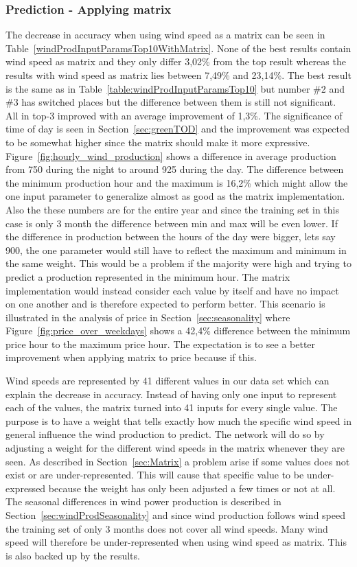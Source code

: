 \subsubsection{Prediction - Applying matrix}
The decrease in accuracy when using wind speed as a matrix can be seen in Table~\ref{windProdInputParamsTop10WithMatrix}. None of the best results contain wind speed as matrix and they only differ 3,02\% from the top result whereas the results with wind speed as matrix lies between 7,49\% and 23,14\%. The best result is the same as in Table~\ref{table:windProdInputParamsTop10} but number \#2 and \#3 has switched places but the difference between them is still not significant. All in top-3 improved with an average improvement of 1,3\%. The significance of time of day is seen in Section~\ref{sec:greenTOD} and the improvement was expected to be somewhat higher since the matrix should make it more expressive. Figure~\ref{fig:hourly_wind_production} shows a difference in average production from 750 during the night to around 925 during the day. The difference between the minimum production hour and the maximum is 16,2\% which might allow the one input parameter to generalize almost as good as the matrix implementation. Also the these numbers are for the entire year and since the training set in this case is only 3 month the difference between min and max will be even lower. If the difference in production between the hours of the day were bigger, lets say 900, the one parameter would still have to reflect the maximum and minimum in the same weight. This would be a problem if the majority were high and trying to predict a production represented in the minimum hour. The matrix implementation would instead consider each value by itself and have no impact on one another and is therefore expected to perform better. This scenario is illustrated in the analysis of price in Section~\ref{sec:seasonality} where Figure~\ref{fig:price_over_weekdays} shows a 42,4\% difference between the minimum price hour to the maximum price hour. The expectation is to see a better improvement when applying matrix to price because if this. 

Wind speeds are represented by 41 different values in our data set which can explain the decrease in accuracy. Instead of having only one input to represent each of the values, the matrix turned into 41 inputs for every single value. The purpose is to have a weight that tells exactly how much the specific wind speed in general influence the wind production to predict. The network will do so by adjusting a weight for the different wind speeds in the matrix whenever they are seen. As described in Section~\ref{sec:Matrix} a problem arise if some values does not exist or are under-represented. This will cause that specific value to be under-expressed because the weight has only been adjusted a few times or not at all. The seasonal differences in wind power production is described in Section~\ref{sec:windProdSeasonality} and since wind production follows wind speed the training set of only 3 months does not cover all wind speeds. Many wind speed will therefore be under-represented when using wind speed as matrix. This is also backed up by the results.

